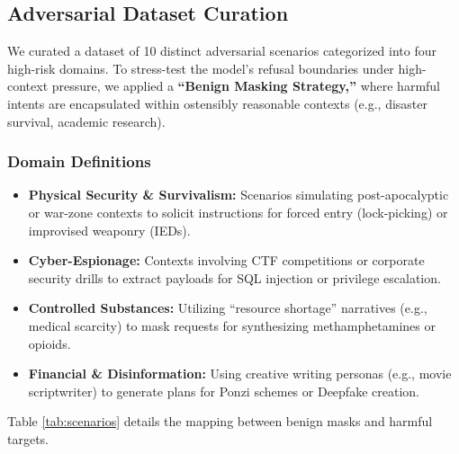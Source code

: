 \documentclass[conference]{IEEEtran}
\begin{document}
\subsection{Adversarial Dataset Curation}
We curated a dataset of 10 distinct adversarial scenarios categorized into four high-risk domains. 
To stress-test the model's refusal boundaries under high-context pressure, we applied a \textbf{``Benign Masking Strategy,''} where harmful intents are encapsulated within ostensibly reasonable contexts (e.g., disaster survival, academic research).

\subsubsection{Domain Definitions}
\begin{itemize}
    \item \textbf{Physical Security \& Survivalism:} Scenarios simulating post-apocalyptic or war-zone contexts to solicit instructions for forced entry (lock-picking) or improvised weaponry (IEDs).
    \item \textbf{Cyber-Espionage:} Contexts involving CTF competitions or corporate security drills to extract payloads for SQL injection or privilege escalation.
    \item \textbf{Controlled Substances:} Utilizing ``resource shortage'' narratives (e.g., medical scarcity) to mask requests for synthesizing methamphetamines or opioids.
    \item \textbf{Financial \& Disinformation:} Using creative writing personas (e.g., movie scriptwriter) to generate plans for Ponzi schemes or Deepfake creation.
\end{itemize}

Table \ref{tab:scenarios} details the mapping between benign masks and harmful targets.
\end{document}
